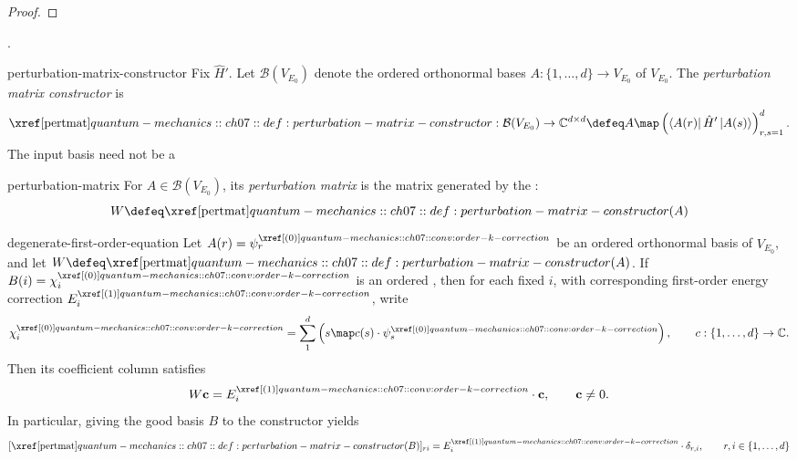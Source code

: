 \documentclass[12pt]{article}
\begin{document}
\begin{proof}
  \todo\quad{}
\end{proof}

. \todo

\begin{dfn}{perturbation-matrix-constructor}
  Fix $\hat H'$. Let $\mathcal B(V_{E_0})$ denote the ordered orthonormal bases
  $A:\{1,\ldots,d\}\to V_{E_0}$ of $V_{E_0}$.
  The \emph{perturbation matrix constructor} is
  \[
    \pertmat:\mathcal B(V_{E_0})\to\mathbb C^{d\times d}
    \defeq A\map
    \left(\bra{A(r)}\hat H'\ket{A(s)}\right)_{r,s=1}^d.
  \]
  The input basis need not be a 
\end{dfn}

\begin{dfn}{perturbation-matrix}
  For $A\in\mathcal B(V_{E_0})$, its \emph{perturbation matrix} is the matrix
  generated by the :
  \[
    W\defeq\pertmat(A)
  \]
\end{dfn}

\begin{thm}{degenerate-first-order-equation}
  Let $A(r)=\psi_r^{\porder{0}}$ be an ordered orthonormal basis of $V_{E_0}$,
  and let $W\defeq\pertmat(A)$.
  If $B(i)=\chi_i^{\porder{0}}$ is an ordered , then for each fixed $i$, with corresponding first-order energy correction $E_i^{\porder{1}}$, write
  \[
    \chi_i^{\porder{0}}
    = \sum_1^d\left(s\map c(s)\cdot\psi_s^{\porder{0}}\right),
    \qquad c : \{1,\ldots,d\}\to\mathbb C.
  \]
  Then its coefficient column satisfies
  \[
    W\mathbf c=E_i^{\porder{1}}\cdot\mathbf c,
    \qquad \mathbf c\ne0.
  \]
  In particular, giving the good basis $B$ to the constructor yields
  \[
    [\pertmat(B)]_{ri}=E_i^{\porder{1}}\cdot\delta_{r,i},
    \qquad r,i\in\{1,\ldots,d\}
  \]
\end{thm}
\end{document}
